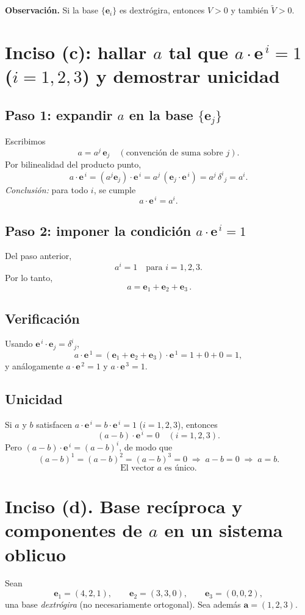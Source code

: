 \documentclass[12pt]{article}
\newcommand{\e}{\mathbf e}   %
\begin{document}
\bigskip
\noindent\textbf{Observación.} Si la base $\{\e_i\}$ es dextrógira, entonces $V>0$ y también $\tilde V>0$.

\section*{Inciso (c): hallar $a$ tal que $a\cdot \e^{\,i}=1$ ($i=1,2,3$) y demostrar unicidad}

\subsection*{Paso 1: expandir $a$ en la base $\{\e_j\}$}
Escribimos
\[
a=a^{j}\,\e_j \quad (\text{convención de suma sobre $j$}).
\]
Por bilinealidad del producto punto,
\[
a\cdot \e^{\,i}=(a^{j}\e_j)\cdot \e^{\,i}=a^{j}\,(\e_j\cdot \e^{\,i})
=a^{j}\,\delta^{i}{}_{j}=a^{i}.
\]
\emph{Conclusión:} para todo $i$, se cumple
\[
a\cdot \e^{\,i}=a^{i}.
\]

\subsection*{Paso 2: imponer la condición $a\cdot \e^{\,i}=1$}
Del paso anterior,
\[
a^{i}=1\quad\text{para } i=1,2,3.
\]
Por lo tanto,
\[
\boxed{\,a=\e_1+\e_2+\e_3\,}.
\]

\subsection*{Verificación}
Usando $\e^{\,i}\!\cdot \e_j=\delta^{i}{}_{j}$,
\[
a\cdot \e^{\,1}=(\e_1+\e_2+\e_3)\cdot \e^{\,1}=1+0+0=1,
\]
y análogamente $a\cdot \e^{\,2}=1$ y $a\cdot \e^{\,3}=1$.

\subsection*{Unicidad}
Si $a$ y $b$ satisfacen $a\cdot \e^{\,i}=b\cdot \e^{\,i}=1$ ($i=1,2,3$), entonces
\[
(a-b)\cdot \e^{\,i}=0\quad (i=1,2,3).
\]
Pero $(a-b)\cdot \e^{\,i}=(a-b)^{i}$, de modo que 
\[
(a-b)^{1}=(a-b)^{2}=(a-b)^{3}=0 \;\Rightarrow\; a-b=0 \;\Rightarrow\; a=b.
\]
\[
\boxed{\text{El vector } a \text{ es único.}}
\]

\section*{Inciso (d). Base recíproca y componentes de $a$ en un sistema oblicuo}

Sean
\[
\e_1=(4,2,1),\qquad 
\e_2=(3,3,0),\qquad 
\e_3=(0,0,2),
\]
una base \emph{dextrógira} (no necesariamente ortogonal). Sea además $\mathbf a=(1,2,3)$.
\end{document}
